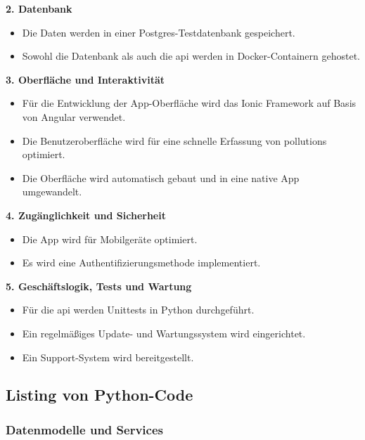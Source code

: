 \documentclass[a4paper,12pt]{article}
\begin{document}
\noindent\textbf{2. Datenbank}
\begin{itemize}
    \item Die Daten werden in einer Postgres-Testdatenbank gespeichert.
    \item Sowohl die Datenbank als auch die \acrshort{api} werden in Docker-Containern gehostet.
\end{itemize}

\noindent\textbf{3. Oberfläche und Interaktivität}
\begin{itemize}
    \item Für die Entwicklung der App-Oberfläche wird das Ionic Framework auf Basis von Angular verwendet.
    \item Die Benutzeroberfläche wird für eine schnelle Erfassung von \glspl{pollution} optimiert.
    \item Die Oberfläche wird automatisch gebaut und in eine native App umgewandelt.
\end{itemize}

\noindent\textbf{4. Zugänglichkeit und Sicherheit}
\begin{itemize}
    \item Die App wird für Mobilgeräte optimiert.
    \item Es wird eine Authentifizierungsmethode implementiert.
\end{itemize}

\noindent\textbf{5. Geschäftslogik, Tests und Wartung}
\begin{itemize}
    \item Für die \gls{api} werden Unittests in Python durchgeführt.
    \item Ein regelmäßiges Update- und Wartungssystem wird eingerichtet.
    \item Ein Support-System wird bereitgestellt.
\end{itemize}

\clearpage
\subsection{Listing von Python-Code}
\subsubsection{Datenmodelle und Services}
\label{sec:python-code}
\end{document}
